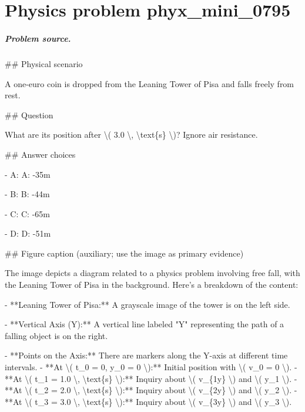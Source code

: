 
\chapter{Physics problem phyx\_mini\_0795}
\label{ch:PhyXMiniProblems_problem_phyx_mini_0795}

\paragraph{Problem source.}
\#\# Physical scenario

A one-euro coin is dropped from the Leaning Tower of Pisa and falls freely from rest.

\#\# Question

What are its position after \textbackslash{}( 3.0 \textbackslash{}, \textbackslash{}text\{s\} \textbackslash{})? Ignore air resistance.

\#\# Answer choices

- A: A: -35m

- B: B: -44m

- C: C: -65m

- D: D: -51m

\#\# Figure caption (auxiliary; use the image as primary evidence)

The image depicts a diagram related to a physics problem involving free fall, with the Leaning Tower of Pisa in the background. Here's a breakdown of the content:

- **Leaning Tower of Pisa:** A grayscale image of the tower is on the left side.

- **Vertical Axis (Y):** A vertical line labeled "Y" representing the path of a falling object is on the right.

- **Points on the Axis:** There are markers along the Y-axis at different time intervals.
  - **At \textbackslash{}( t\_0 = 0, y\_0 = 0 \textbackslash{}):** Initial position with \textbackslash{}( v\_0 = 0 \textbackslash{}).
  - **At \textbackslash{}( t\_1 = 1.0 \textbackslash{}, \textbackslash{}text\{s\} \textbackslash{}):** Inquiry about \textbackslash{}( v\_\{1y\} \textbackslash{}) and \textbackslash{}( y\_1 \textbackslash{}).
  - **At \textbackslash{}( t\_2 = 2.0 \textbackslash{}, \textbackslash{}text\{s\} \textbackslash{}):** Inquiry about \textbackslash{}( v\_\{2y\} \textbackslash{}) and \textbackslash{}( y\_2 \textbackslash{}).
  - **At \textbackslash{}( t\_3 = 3.0 \textbackslash{}, \textbackslash{}text\{s\} \textbackslash{}):** Inquiry about \textbackslash{}( v\_\{3y\} \textbackslash{}) and \textbackslash{}( y\_3 \textbackslash{}).

